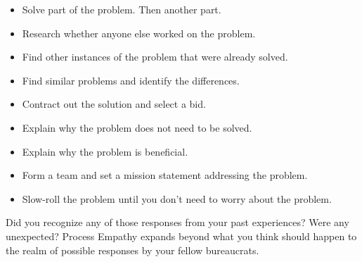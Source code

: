 \begin{itemize}
    \item Solve part of the problem. Then another part.
    \item Research whether anyone else worked on the problem.
    \item Find other instances of the problem that were already solved.
    \item Find similar problems and identify the differences.
    \item Contract out the solution and select a bid.
    \item Explain why the problem does not need to be solved.
    \item Explain why the problem is beneficial. 
    \item Form a team and set a mission statement addressing the problem.
    \item Slow-roll the problem until you don't need to worry about the problem. 
\end{itemize}


Did you recognize any of those responses from your past experiences? 
Were any unexpected? 
Process Empathy expands beyond what you think should happen to the realm of possible responses by your fellow bureaucrats. 